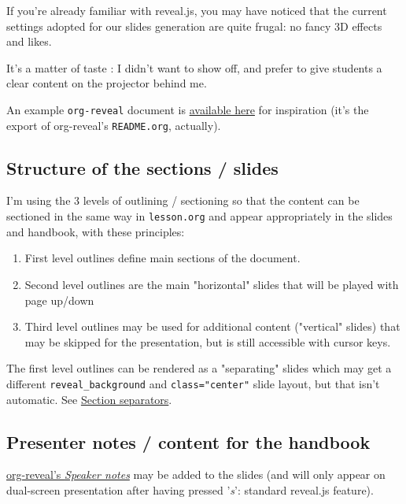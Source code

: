 \documentclass[a4paper]{article}
\begin{document}
If you're already familiar with reveal.js, you may have noticed that
the current settings adopted for our slides generation are quite
frugal: no fancy 3D effects and likes.


\begin{NOTES}
It's a matter of taste : I didn't want to show off, and prefer to give
students a clear content on the projector behind me.

An example \texttt{org-reveal} document is \href{elisp/org-reveal/Readme.html}{available here} for inspiration (it's the export of org-reveal's \texttt{README.org}, actually).
\end{NOTES}

\subsection{Structure of the sections / slides}
\label{sec:org3be9cd6}

I'm using the 3 levels of outlining / sectioning so that the content can be sectioned in the same way in \texttt{lesson.org} and appear appropriately in the slides and handbook, with these principles:

\begin{enumerate}
\item First level outlines define main sections of the document.
\item Second level outlines are the main "horizontal" slides that will be played with page up/down
\item Third level outlines may be used for additional content ("vertical" slides) that may be skipped for the presentation, but is still accessible with cursor keys.
\end{enumerate}

\begin{NOTES}
The first level outlines can be rendered as a "separating" slides which may get a different \texttt{reveal\_background} and \texttt{class="center"} slide layout, but that isn't automatic. See \hyperref[sec:org1e021b8]{Section separators}.
\end{NOTES}

\subsection{Presenter notes / content for the handbook}
\label{sec:org8e281eb}

\href{https://github.com/yjwen/org-reveal/\#speaker-notes}{org-reveal's \emph{Speaker notes}} may be added to the slides (and will only appear on
dual-screen presentation after having pressed '\emph{s}': standard reveal.js
feature).
\end{document}
